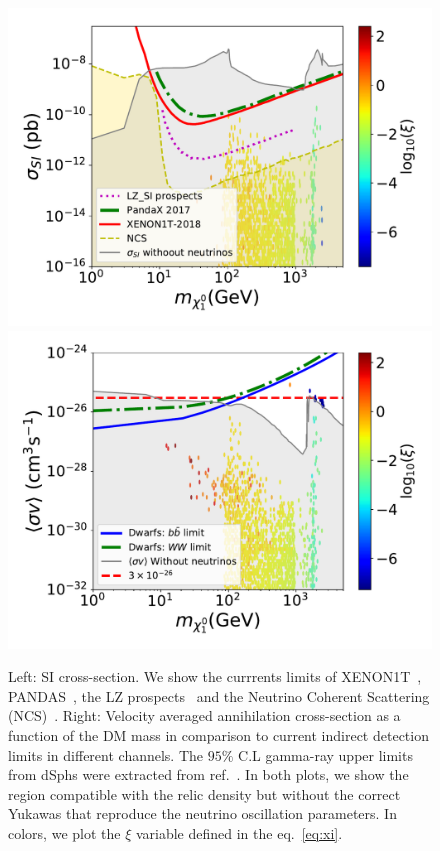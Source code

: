 \documentclass[12pt,letterpaper]{article}
\begin{document}
\begin{figure}
\begin{center}
\includegraphics[scale=0.43]{sigmaSI_with_neutrino_physics}
\includegraphics[scale=0.43]{sigmav_with_neutrino_physics}
\caption{Left: SI cross-section. We show the currrents limits of XENON1T~\cite{Aprile:2018dbl}, PANDAS~\cite{Cui:2017nnn}, the LZ prospects~\cite{Mount:2017qzi} and the Neutrino Coherent Scattering (NCS)~\cite{Cushman:2013zza, Billard:2013qya}. 
Right:  Velocity averaged annihilation cross-section as a function of the DM
mass in comparison to current indirect detection limits in different channels. The $95\%$ C.L gamma-ray upper limits from dSphs were extracted from ref.~\cite{Ackermann:2015zua}.
In both plots, we show  the region compatible with the relic density but without the correct Yukawas that reproduce the neutrino oscillation parameters. In colors, we plot the $\xi$ variable defined in the eq.~\ref{eq:xi}.
}
\label{fig:SI-and-sv-with-neutrinos-scan}
\end{center}
\end{figure}
\end{document}
